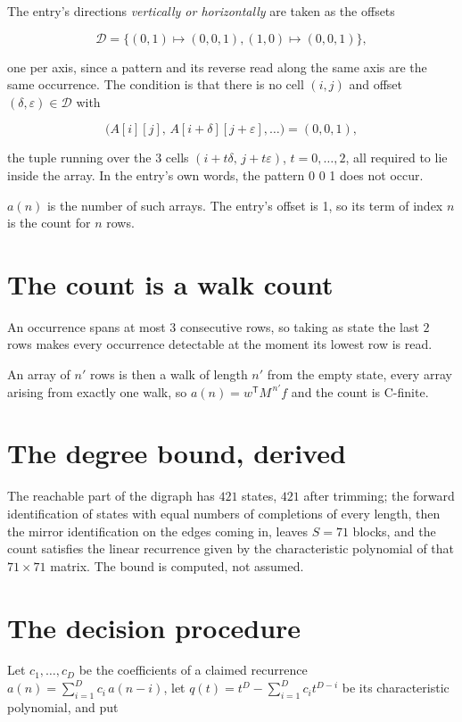 \documentclass[11pt]{article}
\theoremstyle{definition}
\begin{document}
The entry's directions {\itshape vertically or horizontally} are taken as the offsets

\[\mathcal{D} = \{(0,1)\mapsto(0,0,1), (1,0)\mapsto(0,0,1)\},\]

one per axis, since a pattern and its reverse read along the same axis are the same occurrence. The condition is that there is no cell $(i,j)$ and offset $(\delta,\varepsilon)\in\mathcal{D}$ with

\[\bigl(A[i][j],\,A[i{+}\delta][j{+}\varepsilon],\dots\bigr) = (0, 0, 1),\]

the tuple running over the $3$ cells $(i+t\delta,\,j+t\varepsilon)$, $t = 0,\dots,2$, all required to lie inside the array. In the entry's own words, the pattern 0 0 1 does not occur.

$a(n)$ is the number of such arrays. The entry's offset is 1, so its term of index $n$ is the count for $n$ rows.

\section{The count is a walk count}

An occurrence spans at most $3$ consecutive rows, so taking as state the last $2$ rows makes every occurrence detectable at the moment its lowest row is read.

An array of $n'$ rows is then a walk of length $n'$ from the empty state, every array arising from exactly one walk, so $a(n) = w^{\mathsf T}M^{\,n'}f$ and the count is C-finite.

\section{The degree bound, derived}

The reachable part of the digraph has $421$ states, $421$ after trimming; the forward identification of states with equal numbers of completions of every length, then the mirror identification on the edges coming in, leaves $S = 71$ blocks, and the count satisfies the linear recurrence given by the characteristic polynomial of that $71\times71$ matrix. The bound is computed, not assumed.

\section{The decision procedure}

Let $c_1,\dots,c_D$ be the coefficients of a claimed recurrence $a(n) = \sum_{i=1}^{D} c_i\,a(n-i)$, let $q(t) = t^{D} - \sum_{i=1}^{D} c_i t^{D-i}$ be its characteristic polynomial, and put
\end{document}
